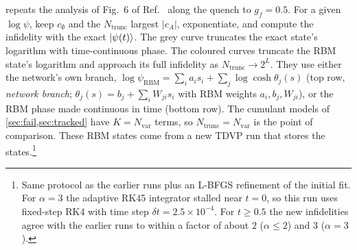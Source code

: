\documentclass[11pt,a4paper]{article}
\begin{document}
 repeats the analysis of Fig.~6 of Ref.~\cite{Cortes25} along the quench to $g_f=0.5$. For a given $\log\psi$, keep $c_\emptyset$ and the $N_\mathrm{trunc}$ largest $|c_A|$, exponentiate, and compute the infidelity with the exact $\ket{\psi(t)}$. The grey curve truncates the exact state's logarithm with time-continuous phase. The coloured curves truncate the RBM state's logarithm and approach its full infidelity as $N_\mathrm{trunc}\to2^L$. They use either the network's own branch, $\log\psi_\mathrm{RBM}=\sum_i a_is_i+\sum_j\log\cosh\theta_j(s)$ (top row, \emph{network branch}; $\theta_j(s)=b_j+\sum_iW_{ji}s_i$ with RBM weights $a_i,b_j,W_{ji}$), or the RBM phase made continuous in time (bottom row). The cumulant models of \cref{sec:fail,sec:tracked} have $K=N_\mathrm{var}$ terms, so $N_\mathrm{trunc}=N_\mathrm{var}$ is the point of comparison. These RBM states come from a new TDVP run that stores the states.\footnote{Same protocol as the earlier runs plus an L-BFGS refinement of the initial fit. For $\alpha=3$ the adaptive RK45 integrator stalled near $t=0$, so this run uses fixed-step RK4 with time step $\delta t=2.5\times10^{-4}$. For $t\ge0.5$ the new infidelities agree with the earlier runs to within a factor of about $2$ ($\alpha\le2$) and $3$ ($\alpha=3$).}
\end{document}
